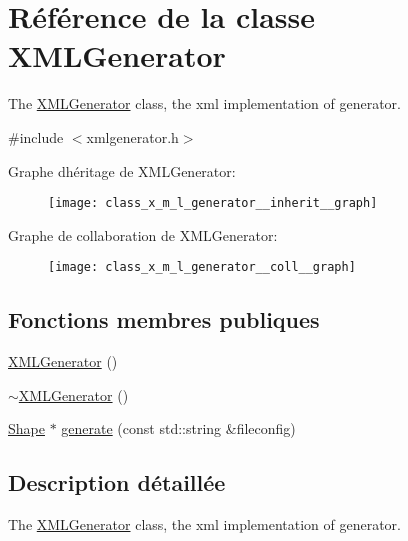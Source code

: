 \hypertarget{class_x_m_l_generator}{}\section{Référence de la classe X\+M\+L\+Generator}
\label{class_x_m_l_generator}


The \hyperlink{class_x_m_l_generator}{X\+M\+L\+Generator} class, the xml implementation of generator.  




{\ttfamily \#include $<$xmlgenerator.\+h$>$}



Graphe d\textquotesingle{}héritage de X\+M\+L\+Generator\+:\nopagebreak
\begin{figure}[H]
\begin{center}
\leavevmode
\texttt{[image: class\_x\_m\_l\_generator\_\_inherit\_\_graph]}
\end{center}
\end{figure}


Graphe de collaboration de X\+M\+L\+Generator\+:\nopagebreak
\begin{figure}[H]
\begin{center}
\leavevmode
\texttt{[image: class\_x\_m\_l\_generator\_\_coll\_\_graph]}
\end{center}
\end{figure}
\subsection*{Fonctions membres publiques}
\begin{DoxyCompactItemize}
\item 
\hyperlink{class_x_m_l_generator_ae88722c986a3d984f0050be10d69e6aa}{X\+M\+L\+Generator} ()
\item 
\hyperlink{class_x_m_l_generator_a8f947bac9f682ba5a22ccb98ff88ff81}{$\sim$\+X\+M\+L\+Generator} ()
\item 
\hyperlink{class_shape}{Shape} $\ast$ \hyperlink{class_x_m_l_generator_adf874b492da2e813980151c3453dd75c}{generate} (const std\+::string \&fileconfig)
\end{DoxyCompactItemize}


\subsection{Description détaillée}
The \hyperlink{class_x_m_l_generator}{X\+M\+L\+Generator} class, the xml implementation of generator. 

